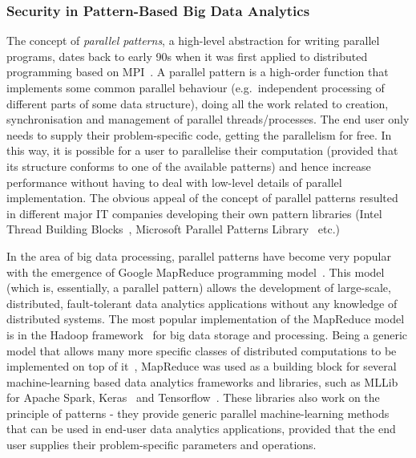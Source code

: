\documentclass[a4paper,11pt]{article}
\begin{document}
\subsubsection{Security in Pattern-Based Big Data Analytics}
\label{sect:patterns}

The concept of \emph{parallel patterns}, a high-level abstraction for writing parallel programs, dates back to early 90s when it was first applied to distributed programming based on MPI~\cite{cole89skeletons}. A parallel pattern is a high-order function that implements some common parallel behaviour (e.g.~independent processing of different parts of some data structure), doing all the work related to creation, synchronisation and management of parallel threads/processes. The end user only needs to supply their problem-specific code, getting the parallelism for free. In this way, it is possible for a user to parallelise their computation (provided that its structure conforms to one of the available patterns) and hence increase performance without having to deal with low-level details of parallel implementation. The obvious appeal of the concept of parallel patterns resulted in different major IT companies developing their own pattern libraries (Intel Thread Building Blocks~\cite{tbb}, Microsoft Parallel Patterns Library~\cite{ppl} etc.)


In the area of big data processing, parallel patterns have become very popular with the emergence of Google MapReduce programming model~\cite{mapreduce}. This model (which is, essentially, a parallel pattern) allows the development of large-scale, distributed, fault-tolerant data analytics applications without any knowledge of distributed systems. The most popular implementation of the MapReduce model is in the Hadoop framework~\cite{hadoop} for big data storage and processing. Being a generic model that allows many more specific classes of distributed computations to be implemented on top of it~\cite{bigdatabook}, MapReduce was used as a building block for several machine-learning based data analytics frameworks and libraries, such as MLLib~\cite{mllib} for Apache Spark, Keras~\cite{keras} and Tensorflow~\cite{tensorflow}. These libraries also work on the principle of patterns - they provide generic parallel machine-learning methods that can be used in end-user data analytics applications, provided that the end user supplies their problem-specific parameters and operations.
\end{document}

